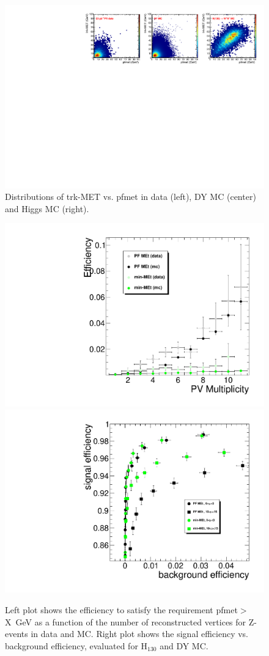 \begin{figure}[hbt]
\begin{center}
\includegraphics[width=1\linewidth]{figures/met_scatter.pdf} 
\caption{\label{fig:met_scatter}\protect Distributions of trk-MET vs. pfmet in data (left), DY MC (center) and Higgs MC (right).}
\end{center}
\end{figure}

 
\begin{figure}[hbt]
\begin{center}
\includegraphics[width=0.45\linewidth]{figures/pfmet_minmet_Eff30.pdf} 
\includegraphics[width=0.45\linewidth]{figures/SignalVsBkgrEfficiency.pdf} 
\caption{\label{fig:met_eff}\protect Left plot shows the efficiency to satisfy
 the requirement pfmet$>$X~GeV as a function of the number of reconstructed 
vertices for Z-events in data and MC. Right plot shows the signal efficiency 
vs. background efficiency, evaluated for H$_{130}$ and DY MC.}
\end{center}
\end{figure}
